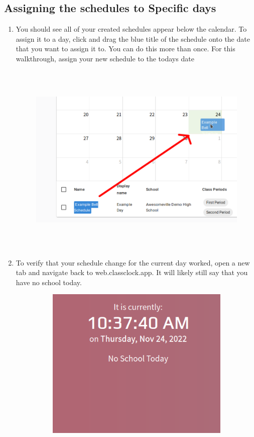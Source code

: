 \documentclass{article}
\begin{document}
\clearpage\subsection{Assigning the schedules to Specific days}
\begin{enumerate}
\item {You should see all of your created schedules appear below the calendar. To assign it to a day, click and drag the blue
title of the schedule onto the date that you want to assign it to. You can do this more than once. For this
walkthrough, assign your new schedule to the todays date\newline
}
\begin{figure}
\includegraphics[width=6.5in,height=3.6807in]{Mini20Manual-img012.png}\end{figure}
\item {To verify that your schedule change for the current day worked, open a new tab and navigate back to web.classclock.app.
It will likely still say that you have no school today.}
\begin{figure}
\includegraphics[width=4.4366in,height=2.8764in]{Mini20Manual-img013.png}\end{figure}

\end{enumerate}
\end{document}

